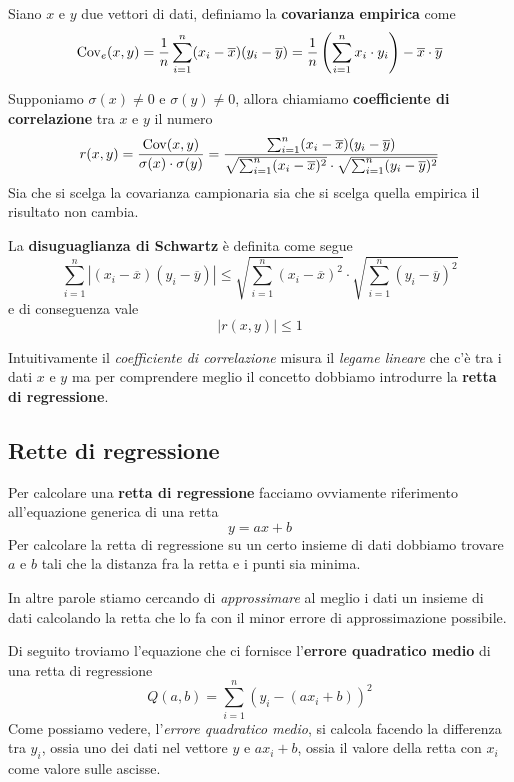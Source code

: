 \begin{definition}
	Siano $x$  e $y$ due vettori di dati, definiamo la \textbf{covarianza empirica} come
	\[
		\operatorname{Cov}_e(x, y) = \frac{1}{n} \sum_{i=1}^n (x_i - \overline{x}) (y_i - \overline{y}) =
		\frac{1}{n} \left( \sum_{i=1}^n x_i \cdot y_i \right) - \overline{x} \cdot \overline{y}
	\]
\end{definition}

\begin{definition}
	Supponiamo $\sigma (x) \neq 0$ e $\sigma (y) \neq 0$, allora chiamiamo
	\textbf{coefficiente di correlazione} tra $x$ e $y$ il numero
	\[
		r(x, y) = \frac{\operatorname{Cov} (x, y)}{\sigma (x) \cdot \sigma (y)} =
		\frac{\sum_{i=1}^n (x_i - \overline{x})(y_i - \overline{y})}
		{\sqrt{\sum_{i=1}^n (x_i - \overline{x})^2} \cdot
			\sqrt{\sum_{i=1}^n (y_i - \overline{y})^2}}
	\]
	Sia che si scelga la covarianza campionaria sia che si scelga quella empirica il risultato
	non cambia.
\end{definition}

\begin{definition}
	La \textbf{disuguaglianza di Schwartz} è definita come segue
	\[
		\sum_{i=1}^n |(x_i - \overline{x}) (y_i - \overline{y})| \leq
		\sqrt{\sum_{i=1}^n (x_i - \overline{x})^2} \cdot \sqrt{\sum_{i=1}^n (y_i - \overline{y})^2}
	\]
	e di conseguenza vale \[ |r(x, y)| \leq 1 \]
\end{definition}

Intuitivamente il \emph{coefficiente di correlazione} misura il \emph{legame lineare} che c'è tra
i dati $x$ e $y$ ma per comprendere meglio il concetto dobbiamo introdurre la
\textbf{retta di regressione}.

\subsection{Rette di regressione}
Per calcolare una \textbf{retta di regressione} facciamo ovviamente riferimento all'equazione
generica di una retta
\[ y = a x + b \]
Per calcolare la retta di regressione su un certo insieme di dati dobbiamo trovare $a$ e $b$ tali
che la distanza fra la retta e i punti sia minima.

In altre parole stiamo cercando di \emph{approssimare} al meglio i dati un insieme di dati
calcolando la retta che lo fa con il minor errore di approssimazione possibile.

Di seguito troviamo l'equazione che ci fornisce l'\textbf{errore quadratico medio} di una retta di
regressione
\[ Q(a, b) = \sum_{i=1}^n (y_i - (a x_i + b))^2 \]
Come possiamo vedere, l'\emph{errore quadratico medio}, si calcola facendo la differenza tra
$y_i$, ossia uno dei dati nel vettore $y$ e $a x_i + b$, ossia il valore della retta con $x_i$
come valore sulle ascisse.

